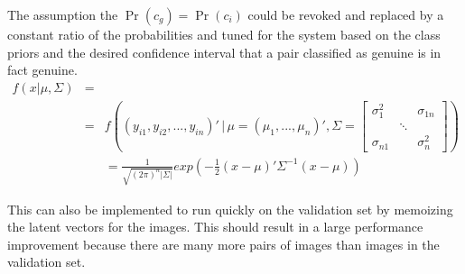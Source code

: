 The assumption the $\Pr(c_g) = \Pr(c_i)$ could be revoked and replaced by a constant ratio of the probabilities and tuned for the system based on the class priors and the desired confidence interval that a pair classified as genuine is in fact genuine.
\begin{eqnarray}
f(x|\mu,\Sigma) & =\nonumber \\
    & = & f((y_{i1},y_{i2},...,y_{in})'\,|\,\mu=(\mu_{1},...,\mu_{n})',\Sigma=\left[\begin{array}{ccc}
\sigma_{1}^{2} &  & \sigma_{1n}\\
    & \ddots\\
\sigma_{n1} &  & \sigma_{n}^{2}
\end{array}\right])\nonumber \\
    &  & =\frac{1}{\sqrt{(2\pi)^{n}|\Sigma|}}exp(-\frac{1}{2}(x-\mu)'\Sigma^{-1}(x-\mu))
\end{eqnarray}

This can also be implemented to run quickly on the validation set by memoizing the latent vectors for the images.
This should result in a large performance improvement because there are many more pairs of images than images in the validation set.
